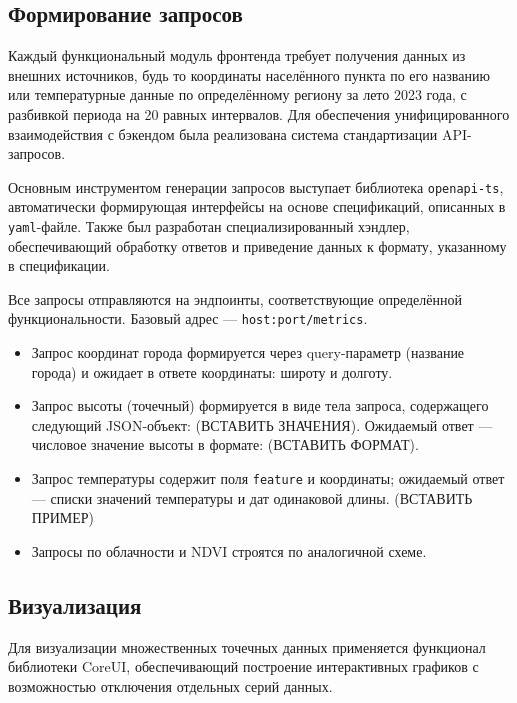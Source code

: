 \subsection*{Формирование запросов}

Каждый функциональный модуль фронтенда требует получения данных из внешних источников, будь то координаты населённого пункта по его названию или температурные данные по определённому региону за лето 2023 года, с разбивкой периода на 20 равных интервалов. Для обеспечения унифицированного взаимодействия с бэкендом была реализована система стандартизации API-запросов.

Основным инструментом генерации запросов выступает библиотека \texttt{openapi-ts}, автоматически формирующая интерфейсы на основе спецификаций, описанных в \texttt{yaml}-файле. Также был разработан специализированный хэндлер, обеспечивающий обработку ответов и приведение данных к формату, указанному в спецификации.

Все запросы отправляются на эндпоинты, соответствующие определённой функциональности. Базовый адрес — \texttt{host:port/metrics}.

\begin{itemize}
	\item Запрос координат города формируется через query-параметр (название города) и ожидает в ответе координаты: широту и долготу.
	
	\item Запрос высоты (точечный) формируется в виде тела запроса, содержащего следующий JSON-объект: (ВСТАВИТЬ ЗНАЧЕНИЯ). Ожидаемый ответ — числовое значение высоты в формате: (ВСТАВИТЬ ФОРМАТ).
	
	\item Запрос температуры содержит поля \texttt{feature} и координаты; ожидаемый ответ — списки значений температуры и дат одинаковой длины. (ВСТАВИТЬ ПРИМЕР)
	
	\item Запросы по облачности и NDVI строятся по аналогичной схеме.
\end{itemize}

\subsection*{Визуализация}

Для визуализации множественных точечных данных применяется функционал библиотеки CoreUI, обеспечивающий построение интерактивных графиков с возможностью отключения отдельных серий данных.

